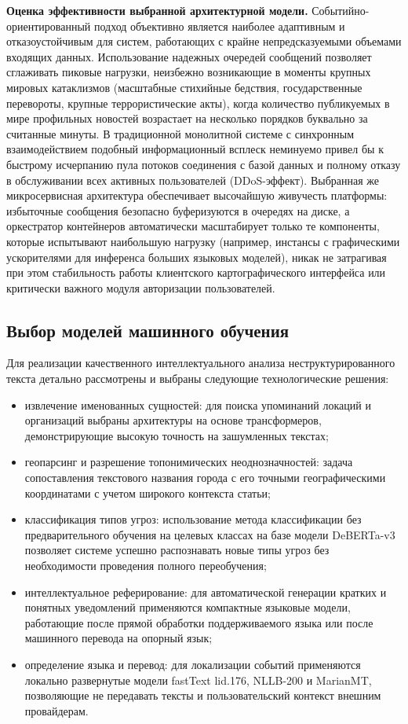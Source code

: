 \textbf{Оценка эффективности выбранной архитектурной модели.} Событийно-ориентированный подход объективно является наиболее адаптивным и отказоустойчивым для систем, работающих с крайне непредсказуемыми объемами входящих данных. Использование надежных очередей сообщений позволяет сглаживать пиковые нагрузки, неизбежно возникающие в моменты крупных мировых катаклизмов (масштабные стихийные бедствия, государственные перевороты, крупные террористические акты), когда количество публикуемых в мире профильных новостей возрастает на несколько порядков буквально за считанные минуты. В традиционной монолитной системе с синхронным взаимодействием подобный информационный всплеск неминуемо привел бы к быстрому исчерпанию пула потоков соединения с базой данных и полному отказу в обслуживании всех активных пользователей (DDoS-эффект). Выбранная же микросервисная архитектура обеспечивает высочайшую живучесть платформы: избыточные сообщения безопасно буферизуются в очередях на диске, а оркестратор контейнеров автоматически масштабирует только те компоненты, которые испытывают наибольшую нагрузку (например, инстансы с графическими ускорителями для инференса больших языковых моделей), никак не затрагивая при этом стабильность работы клиентского картографического интерфейса или критически важного модуля авторизации пользователей.
\subsection{Выбор моделей машинного обучения}

Для реализации качественного интеллектуального анализа неструктурированного текста детально рассмотрены и выбраны следующие технологические решения:
\begin{itemize}
\item извлечение именованных сущностей: для поиска упоминаний локаций и организаций выбраны архитектуры на основе трансформеров, демонстрирующие высокую точность на зашумленных текстах\cite{bert_ner_bib};
\item геопарсинг и разрешение топонимических неоднозначностей: задача сопоставления текстового названия города с его точными географическими координатами с учетом широкого контекста статьи\cite{mordecai_bib};
\item классификация типов угроз: использование метода классификации без предварительного обучения на целевых классах на базе модели DeBERTa-v3 позволяет системе успешно распознавать новые типы угроз без необходимости проведения полного переобучения\cite{deberta_bib};
\item интеллектуальное реферирование: для автоматической генерации кратких и понятных уведомлений применяются компактные языковые модели, работающие после прямой обработки поддерживаемого языка или после машинного перевода на опорный язык;
\item определение языка и перевод: для локализации событий применяются локально развернутые модели fastText lid.176, NLLB-200 и MarianMT, позволяющие не передавать тексты и пользовательский контекст внешним провайдерам.
\end{itemize}

